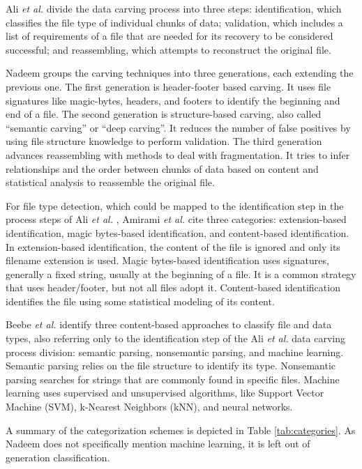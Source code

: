 Ali \textit{et al.} \cite{ali_review_2018} divide the data carving process into three steps:
    identification, which classifies the file type of individual chunks of data; 
    validation, which includes a list of requirements of a file that are needed for its recovery to be considered successful; and
    reassembling, which attempts to reconstruct the original file.
    
Nadeem \cite{nadeem_ashraf_forensic_2013} groups the carving techniques into three generations, each extending the previous one.
The first generation is header-footer based carving. It uses file signatures like magic-bytes, headers, and footers to identify the beginning and end of a file.
The second generation is structure-based carving, also called ``semantic carving'' or ``deep carving''. It reduces the number of false positives by using file structure knowledge to perform validation.
The third generation advances reassembling with methods to deal with fragmentation. It tries to infer relationships and the order between chunks of data based on content and statistical analysis to reassemble the original file.

For file type detection, which could be mapped to the identification step in the  process steps of Ali \textit{et al.} \cite{ali_review_2018}, Amirami \textit{et al.} \cite{amirani_new_2008} cite three categories: extension-based identification, magic bytes-based identification, and content-based identification.
In extension-based identification, the content of the file is ignored and only its filename extension is used. Magic bytes-based identification uses signatures, generally a fixed string, usually at the beginning of a file. It is a common strategy that uses header/footer, but not all files adopt it. Content-based identification identifies the file using some statistical modeling of its content.

Beebe \textit{et al.} \cite{beebe_sceadan:_2013} identify three content-based approaches to classify file and data types, also referring only to the identification step of the Ali \textit{et al.} \cite{ali_review_2018} data carving process division: semantic parsing, nonsemantic parsing, and machine learning. Semantic parsing relies on the file structure to identify its type. Nonsemantic parsing searches for strings that are commonly found in specific files. Machine learning uses supervised and unsupervised algorithms, like Support Vector Machine (SVM), k-Nearest Neighbors (kNN), and neural networks.

A summary of the categorization schemes is depicted in Table \ref{tab:categories}. As Nadeem \cite{nadeem_ashraf_forensic_2013} does not specifically mention machine learning, it is left out of generation classification.



